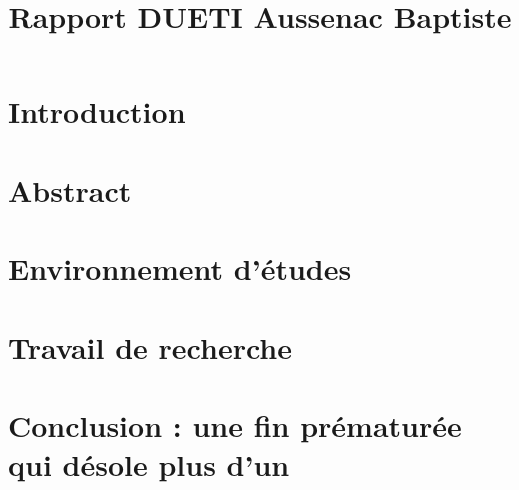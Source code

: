 \documentclass{rapportDUETI}
\title{Rapport DUETI Aussenac Baptiste} %
\begin{document}




        
\fairemarges %
\fairepagedegarde %
\tabledematieres %




\section{Introduction} 



\newpage

\section{Abstract} 



\newpage

\section{Environnement d'études}


\newpage

\section{Travail de recherche}


\newpage

\section{Conclusion : une fin prématurée qui désole plus d'un}


\newpage
\end{document}
